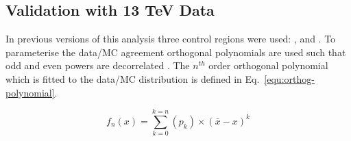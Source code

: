 \subsection{Validation with 13 TeV Data}
\label{sec:valid13}
In previous versions of this analysis three control regions
were used: \mj, \mmj and \gj. To parameterise the data/MC agreement
orthogonal polynomials are used such that odd and even powers 
are decorrelated \cite{cohen2013applied}. 
The $n^{th}$ order orthogonal polynomial which is fitted to the data/MC 
distribution is defined in Eq.~\ref{equ:orthog-polynomial}.

\begin{equation}
  \label{equ:orthog-polynomial}
  f_n(x) = \sum_{k=0}^{k=n}{(p_k)\times(\bar{x}-x)^k}
\end{equation}

